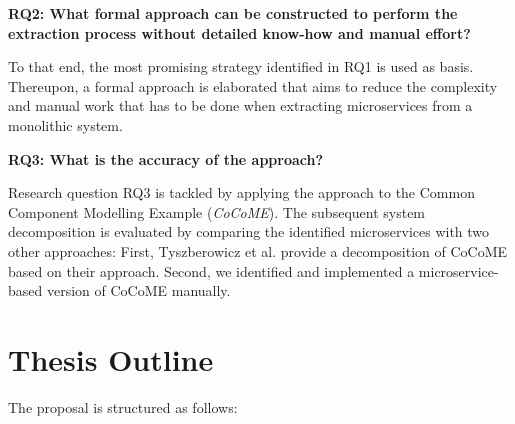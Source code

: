 \noindent
\textbf{RQ2: What formal approach can be constructed to perform the extraction process 
	without detailed know-how and manual effort?}

\vspace{0.5cm}
\noindent
To that end, the most promising strategy identified in RQ1 is used as basis. Thereupon, a formal approach is elaborated that aims to reduce the complexity and manual work that has to be done when extracting microservices from a monolithic system.
\vspace{0.5cm}


\noindent
\textbf{RQ3: What is the accuracy of the approach?   }

\vspace{0.5cm}
\noindent
Research question RQ3 is tackled by applying the approach to the Common Component Modelling Example (\textit{CoCoME}). The subsequent system decomposition is evaluated by comparing the identified microservices with two other approaches: First, Tyszberowicz et al. \cite{FunctionalDecompositionHeinrich} provide a decomposition of CoCoME based on their approach. Second, we identified and implemented a microservice-based version of CoCoME manually. 

\vspace{0.5cm}



\endgroup
\vspace{1cm}







\section{Thesis Outline}
\label{sec_Introduction:ThesisOutline}
The proposal is structured as follows:

